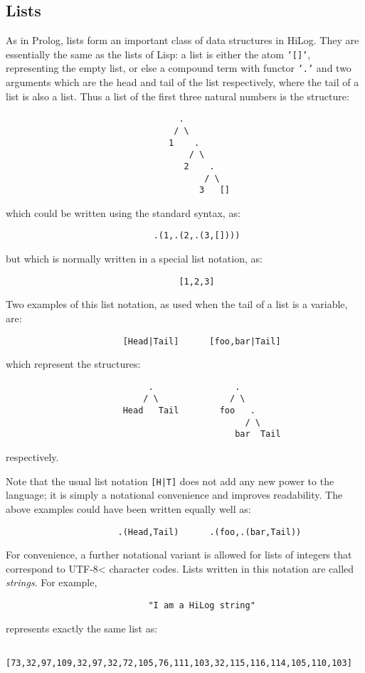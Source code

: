 \subsection{Lists}\label{Lists}
As in Prolog, lists form an important class of data structures in HiLog.
They are essentially the same as the lists of Lisp: a list is either the atom
{\tt '[]'}, representing the empty list, or else a compound term with functor
{\tt '.'}  and two arguments which are the head and tail of the list
respectively, where the tail of a list is also a list.
Thus a list of the first three natural numbers is the structure:
\begin{verbatim}
                                  .
                                 / \
                                1    .
                                    / \
                                   2    .
                                       / \
                                      3   []
\end{verbatim}
which could be written using the standard syntax, as:
\begin{verbatim}
                             .(1,.(2,.(3,[])))
\end{verbatim}
but which is normally written in a special list notation, as:
\begin{verbatim}
                                  [1,2,3]
\end{verbatim}
Two examples of this list notation, as used when the tail of a list is a
variable, are:
\begin{verbatim}
                       [Head|Tail]      [foo,bar|Tail]
\end{verbatim}
which represent the structures:
\begin{verbatim}
                            .                .
                           / \              / \
                       Head   Tail        foo   .
                                               / \
                                             bar  Tail
\end{verbatim}
respectively.

Note that the usual list notation {\tt [H|T]} does not add any new power
to the language; it is simply a notational convenience and improves
readability. The above examples could have been written equally well as:
\begin{verbatim}
                      .(Head,Tail)      .(foo,.(bar,Tail))
\end{verbatim}

For convenience, a further notational variant is allowed for lists of
integers that correspond to UTF-8< character codes.  Lists written in this
notation are called {\em strings}.  For example,
\begin{verbatim}
                            "I am a HiLog string"
\end{verbatim}
represents exactly the same list as:
\begin{verbatim}
    [73,32,97,109,32,97,32,72,105,76,111,103,32,115,116,114,105,110,103]
\end{verbatim}


